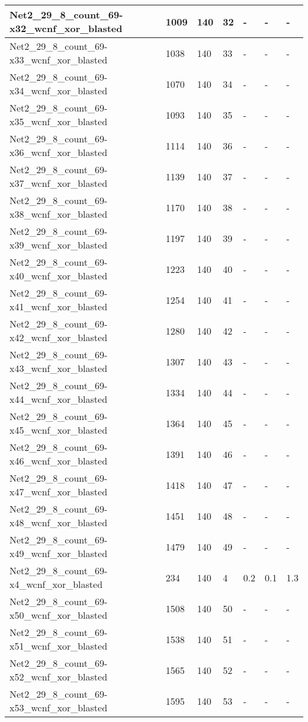 \begin{scriptsize}
\begin{longtable}{|p{5cm}|l|l|l|l|l|l|}
Net2\_29\_8\_count\_69-x32\_wcnf\_xor\_blasted&1009&140&32&-&-&- \\ \hline 
Net2\_29\_8\_count\_69-x33\_wcnf\_xor\_blasted&1038&140&33&-&-&- \\ \hline 
Net2\_29\_8\_count\_69-x34\_wcnf\_xor\_blasted&1070&140&34&-&-&- \\ \hline 
Net2\_29\_8\_count\_69-x35\_wcnf\_xor\_blasted&1093&140&35&-&-&- \\ \hline 
Net2\_29\_8\_count\_69-x36\_wcnf\_xor\_blasted&1114&140&36&-&-&- \\ \hline 
Net2\_29\_8\_count\_69-x37\_wcnf\_xor\_blasted&1139&140&37&-&-&- \\ \hline 
Net2\_29\_8\_count\_69-x38\_wcnf\_xor\_blasted&1170&140&38&-&-&- \\ \hline 
Net2\_29\_8\_count\_69-x39\_wcnf\_xor\_blasted&1197&140&39&-&-&- \\ \hline 
Net2\_29\_8\_count\_69-x40\_wcnf\_xor\_blasted&1223&140&40&-&-&- \\ \hline 
Net2\_29\_8\_count\_69-x41\_wcnf\_xor\_blasted&1254&140&41&-&-&- \\ \hline 
Net2\_29\_8\_count\_69-x42\_wcnf\_xor\_blasted&1280&140&42&-&-&- \\ \hline 
Net2\_29\_8\_count\_69-x43\_wcnf\_xor\_blasted&1307&140&43&-&-&- \\ \hline 
Net2\_29\_8\_count\_69-x44\_wcnf\_xor\_blasted&1334&140&44&-&-&- \\ \hline 
Net2\_29\_8\_count\_69-x45\_wcnf\_xor\_blasted&1364&140&45&-&-&- \\ \hline 
Net2\_29\_8\_count\_69-x46\_wcnf\_xor\_blasted&1391&140&46&-&-&- \\ \hline 
Net2\_29\_8\_count\_69-x47\_wcnf\_xor\_blasted&1418&140&47&-&-&- \\ \hline 
Net2\_29\_8\_count\_69-x48\_wcnf\_xor\_blasted&1451&140&48&-&-&- \\ \hline 
Net2\_29\_8\_count\_69-x49\_wcnf\_xor\_blasted&1479&140&49&-&-&- \\ \hline 
Net2\_29\_8\_count\_69-x4\_wcnf\_xor\_blasted&234&140&4&0.2&0.1&1.3 \\ \hline 
Net2\_29\_8\_count\_69-x50\_wcnf\_xor\_blasted&1508&140&50&-&-&- \\ \hline 
Net2\_29\_8\_count\_69-x51\_wcnf\_xor\_blasted&1538&140&51&-&-&- \\ \hline 
Net2\_29\_8\_count\_69-x52\_wcnf\_xor\_blasted&1565&140&52&-&-&- \\ \hline 
Net2\_29\_8\_count\_69-x53\_wcnf\_xor\_blasted&1595&140&53&-&-&- \\ \hline 

\end{longtable}
\end{scriptsize}
